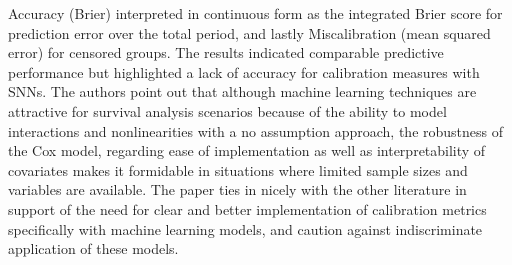 





\noindent Accuracy (Brier) interpreted in continuous form as the integrated Brier score for prediction error over the total period, and lastly Miscalibration (mean squared error) for censored groups. \parencite{kantidakis_simulation_2021} The results indicated comparable predictive performance but highlighted a lack of accuracy for calibration measures with SNNs. The authors point out that although machine learning techniques are attractive for survival analysis scenarios because of the ability to model interactions and nonlinearities with a no assumption approach, the robustness of the Cox model, regarding ease of implementation as well as interpretability of covariates makes it formidable in situations where limited sample sizes and variables are available. The paper ties in nicely with the other literature in support of the need for clear and better implementation of calibration metrics specifically with machine learning models, and caution against indiscriminate application of these models.


